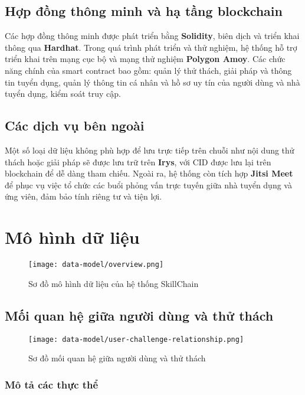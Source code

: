 \subsection{Hợp đồng thông minh và hạ tầng blockchain}

Các hợp đồng thông minh được phát triển bằng \textbf{Solidity}, biên dịch và triển khai thông qua \textbf{Hardhat}. Trong quá trình phát triển và thử nghiệm, hệ thống hỗ trợ triển khai trên mạng cục bộ và mạng thử nghiệm \textbf{Polygon Amoy}.
Các chức năng chính của smart contract bao gồm: quản lý thử thách, giải pháp và thông tin tuyển dụng, quản lý thông tin cá nhân và hồ sơ uy tín của người dùng và nhà tuyển dụng, kiểm soát truy cập.

\subsection{Các dịch vụ bên ngoài}

Một số loại dữ liệu không phù hợp để lưu trực tiếp trên chuỗi như nội dung thử thách hoặc giải pháp sẽ được lưu trữ trên \textbf{Irys}, với CID được lưu lại trên blockchain để dễ dàng tham chiếu.
Ngoài ra, hệ thống còn tích hợp \textbf{Jitsi Meet} để phục vụ việc tổ chức các buổi phỏng vấn trực tuyến giữa nhà tuyển dụng và ứng viên, đảm bảo tính riêng tư và tiện lợi.

\section{Mô hình dữ liệu}

\begin{figure}[H]
  \centering
  \texttt{[image: data-model/overview.png]}
  \caption{Sơ đồ mô hình dữ liệu của hệ thống SkillChain}
  \label{fig:overview-relationship}
\end{figure}

\subsection{Mối quan hệ giữa người dùng và thử thách}
\begin{figure}[H]
  \centering
  \texttt{[image: data-model/user-challenge-relationship.png]}
  \caption{Sơ đồ mối quan hệ giữa người dùng và thử thách}
  \label{fig:user-challenge-relationship}
\end{figure}

\subsubsection{Mô tả các thực thể}

